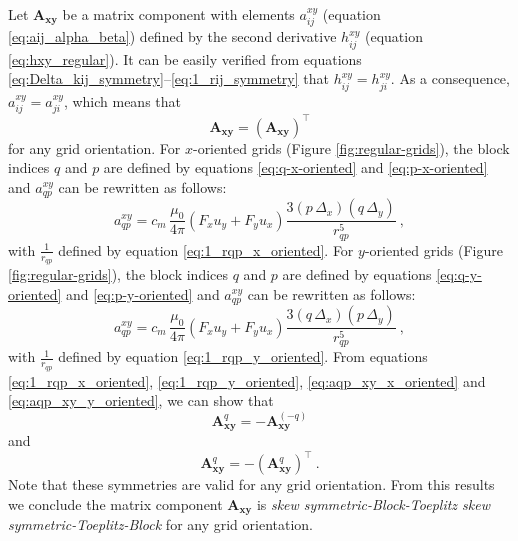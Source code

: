 \documentclass[manuscript]{geophysics}
\begin{document}
	Let $\mathbf{A}_{\boldsymbol{xy}}$ be a matrix component with elements
	$a^{xy}_{ij}$ (equation \ref{eq:aij_alpha_beta}) defined by the second derivative
	$h^{xy}_{ij}$ (equation \ref{eq:hxy_regular}). It can be easily verified from equations
	\ref{eq:Delta_kij_symmetry}--\ref{eq:1_rij_symmetry} that $h^{xy}_{ij} = h^{xy}_{ji}$.
	As a consequence, $a^{xy}_{ij} = a^{xy}_{ji}$, which means that 
	\begin{equation}
		\mathbf{A}_{\boldsymbol{xy}} = \left( \mathbf{A}_{\boldsymbol{xy}} \right)^{\top}
		\label{eq:Axy_symmetry}
	\end{equation}
	for any grid orientation.
	For $x$-oriented grids (Figure \ref{fig:regular-grids}), the block indices $q$ and $p$ are defined 
	by equations \ref{eq:q-x-oriented} and 
	\ref{eq:p-x-oriented} and $a^{xy}_{qp}$ can be rewritten as follows:
	\begin{equation}
		a^{xy}_{qp} = c_{m} \, \frac{\mu_{0}}{4\pi} 
		\left( F_{x} u_{y} + F_{y} u_{x} \right) \frac{3 \left( p \, \Delta_{x} \right)\left( q \, \Delta_{y} \right)}{r_{qp}^{5}}
		\: ,
		\label{eq:aqp_xy_x_oriented}
	\end{equation}
	with $\tfrac{1}{r_{qp}}$ defined by equation \ref{eq:1_rqp_x_oriented}.
	For $y$-oriented grids (Figure \ref{fig:regular-grids}), the block indices $q$ and $p$ are 
	defined by equations \ref{eq:q-y-oriented} and 
	\ref{eq:p-y-oriented} and $a^{xy}_{qp}$ can be rewritten as follows:
	\begin{equation}
		a^{xy}_{qp} = c_{m} \, \frac{\mu_{0}}{4\pi} 
		\left( F_{x} u_{y} + F_{y} u_{x} \right) \frac{3 \left( q \, \Delta_{x} \right)\left( p \, \Delta_{y} \right)}{r_{qp}^{5}} \: ,
		\label{eq:aqp_xy_y_oriented}
	\end{equation}
	with $\tfrac{1}{r_{qp}}$ defined by equation \ref{eq:1_rqp_y_oriented}.
	From equations \ref{eq:1_rqp_x_oriented}, \ref{eq:1_rqp_y_oriented}, \ref{eq:aqp_xy_x_oriented} 
	and \ref{eq:aqp_xy_y_oriented}, we can show that
	\begin{equation}
		\mathbf{A}_{\boldsymbol{xy}}^{q} = -\mathbf{A}_{\boldsymbol{xy}}^{(-q)}
		\label{eq:Axy_q_external_block_symmetry}
	\end{equation}
	and 
	\begin{equation}
		\mathbf{A}_{\boldsymbol{xy}}^{q} = -\left( \mathbf{A}_{\boldsymbol{xy}}^{q} \right)^{\top} \: .
		\label{eq:Axy_q_internal_block_symmetry}
	\end{equation}
	Note that these symmetries are valid for any grid orientation.
	From this results we conclude the matrix component 
	$\mathbf{A}_{\boldsymbol{xy}}$ is \textit{skew symmetric-Block-Toeplitz skew symmetric-Toeplitz-Block} 
	for any grid orientation.
	
\end{document}
